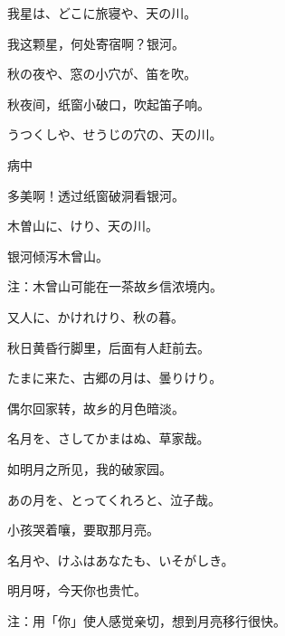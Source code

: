 \begin{haiku}
    {\FH 我星は、どこに旅寝や、天の川。}

    {\FK 我这颗星，何处寄宿啊？银河。}
\end{haiku}

\begin{haiku}
    {\FH 秋の夜や、窓の小穴が、笛を吹。}

    {\FK 秋夜间，纸窗小破口，吹起笛子响。}
\end{haiku}

\begin{haiku}
    {\FH うつくしや、せうじの穴の、天の川。}

    {\FK 病中}

    {\FK 多美啊！透过纸窗破洞看银河。}
\end{haiku}

\begin{haiku}
    {\FH 木曽山に、けり、天の川。}

    {\FK 银河倾泻木曾山。}

    {\FT 注：木曾山可能在一茶故乡信浓境内。}
\end{haiku}

\begin{haiku}
    {\FH 又人に、かけれけり、秋の暮。}

    {\FK 秋日黄昏行脚里，后面有人赶前去。}
\end{haiku}

\begin{haiku}
    {\FH たまに来た、古郷の月は、曇りけり。}

    {\FK 偶尔回家转，故乡的月色暗淡。}
\end{haiku}

\begin{haiku}
    {\FH 名月を、さしてかまはぬ、草家哉。}

    {\FK 如明月之所见，我的破家园。}
\end{haiku}

\begin{haiku}
    {\FH あの月を、とってくれろと、泣子哉。}

    {\FK 小孩哭着嚷，要取那月亮。}
\end{haiku}

\begin{haiku}
    {\FH 名月や、けふはあなたも、いそがしき。}

    {\FK 明月呀，今天你也贵忙。}

    {\FT 注：用「你」使人感觉亲切，想到月亮移行很快。}
\end{haiku}

